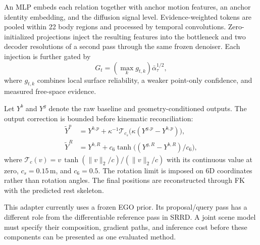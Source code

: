 An MLP embeds each relation together with anchor motion features, an anchor identity embedding, and the diffusion signal level. Evidence-weighted tokens are pooled within 22 body regions and processed by temporal convolutions. Zero-initialized projections inject the resulting features into the bottleneck and two decoder resolutions of a second pass through the same frozen denoiser. Each injection is further gated by
\begin{equation}
G_t=\left(\max_k g_{t,k}\right)\bar\alpha_\tau^{1/2},
\label{eq:scene_gate}
\end{equation}
where $g_{t,k}$ combines local surface reliability, a weaker point-only confidence, and measured free-space evidence.

Let $Y^b$ and $Y^g$ denote the raw baseline and geometry-conditioned outputs. The output correction is bounded before kinematic reconciliation:
\begin{equation}
\begin{aligned}
\widetilde Y^p &=Y^{b,p}
+\kappa^{-1}\mathcal T_{c_s}
\big(\kappa(Y^{g,p}-Y^{b,p})\big),\\
\widetilde Y^R&=Y^{b,R}
+c_6\tanh\big((Y^{g,R}-Y^{b,R})/c_6\big),
\end{aligned}
\label{eq:scene_bounds}
\end{equation}
where $\mathcal T_c(v)=v\,\tanh(\|v\|_2/c)/(\|v\|_2/c)$ with its continuous value at zero, $c_s=0.15\,\mathrm{m}$, and $c_6=0.5$. The rotation limit is imposed on 6D coordinates rather than rotation angles. The final positions are reconstructed through FK with the predicted rest skeleton.

This adapter currently uses a frozen EGO prior. Its proposal/query pass has a different role from the differentiable reference pass in SRRD. A joint scene model must specify their composition, gradient paths, and inference cost before these components can be presented as one evaluated method.


